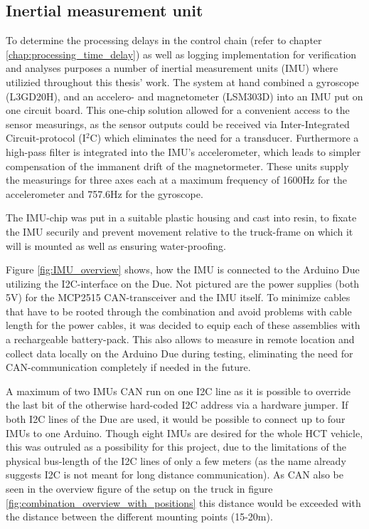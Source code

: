 \documentclass[ExampleMasters.tex]{subfiles}
\begin{document}
\subsection{Inertial measurement unit}
\label{sec:IMU}
To determine the processing delays in the control chain (refer to chapter \ref{chap:processing_time_delay}) as well as logging implementation for verification and analyses purposes a number of inertial measurement units (IMU) where utilizied throughout this thesis' work. The system at hand combined a gyroscope (L3GD20H), and an accelero- and magnetometer (LSM303D) into an \gls{IMU} put on one circuit board.\cite{IMU_homepage_shop} This one-chip solution allowed for a convenient access to the sensor measurings, as the sensor outputs could be received via Inter-Integrated Circuit-protocol (I$^{2}$C)  which eliminates the need for a transducer. Furthermore a high-pass filter is integrated into the \gls{IMU}'s accelerometer, which leads to simpler compensation of the immanent drift of the magnetormeter. These units supply the measurings for three axes each at a maximum frequency of 1600Hz for the accelerometer and 757.6Hz for the gyroscope.  \cite{accelerometer_datasheet}\cite{gyrometer_datasheet}

The \gls{IMU}-chip was put in a suitable plastic housing and cast into resin, to fixate the \gls{IMU} securily and prevent movement relative to the truck-frame on which it will is mounted as well as ensuring water-proofing.

Figure \ref{fig:IMU_overview} shows, how the \gls{IMU} is connected to the Arduino Due utilizing the \gls{I2C}-interface on the Due. Not pictured are the power supplies (both 5V) for the MCP2515 \gls{CAN}-transceiver and the \gls{IMU} itself. To minimize cables that have to be rooted through the combination and avoid problems with cable length for the power cables, it was decided to equip each of these assemblies with a rechargeable battery-pack. This also allows to measure in remote location and collect data locally on the Arduino Due during testing, eliminating the need for CAN-communication completely if needed in the future.

A maximum of two \gls{IMU}s \gls{CAN} run on one \gls{I2C} line as it is possible to override the last bit of the otherwise hard-coded \gls{I2C} address via a hardware jumper. If both \gls{I2C} lines of the Due are used, it would be possible to connect up to four IMUs to one Arduino. Though eight \gls{IMU}s are desired for the whole \gls{HCT} vehicle, this was outruled as a possibility for this project, due to the limitations of the physical bus-length of the \gls{I2C} lines of only a few meters (as the name already suggests \gls{I2C} is not meant for long distance communication). As \gls{CAN} also be seen in the overview figure of the setup on the truck in figure \ref{fig:combination_overview_with_positions} this distance would be exceeded with the distance between the different mounting points (15-20m).
\end{document}
